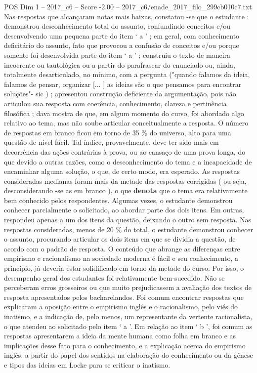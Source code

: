 \begin{textsample}{POS Dim 1 – 2017\_c6 – Score -2.00 – 2017\_c6/enade\_2017\_filo\_299cb010c7.txt}
Nas respostas que alcançaram notas mais baixas, constatou -se que o estudante : demonstrou desconhecimento total do assunto, confundindo conceitos e/ou desenvolvendo uma pequena parte do item ‘ a ’ ; em geral, com conhecimento deficitário do assunto, fato que provocou a confusão de conceitos e/ou porque somente foi desenvolvida parte do item ‘ a ’ ; construiu o texto de maneira incoerente ou tautológica ou a partir do parafrasear do enunciado ou, ainda, totalmente desarticulado, no mínimo, com a pergunta ("quando falamos da ideia, falamos de pensar, organizar [... ] as ideias são o que pensamos para encontrar soluções"- sic ) ; apresentou construção deficiente da argumentação, pois não articulou sua resposta com coerência, conhecimento, clareza e pertinência filosófica ; dava mostra de que, em algum momento do curso, foi abordado algo relativo ao tema, mas não soube articular conceitualmente a resposta.
O número de respostas em branco ficou em torno de 35 \% do universo, alto para uma questão de nível fácil.
Tal índice, provavelmente, deve ter sido mais em decorrência das ações contrárias à prova, ou ao cansaço de uma prova longa, do que devido a outras razões, como o desconhecimento do tema e a incapacidade de encaminhar alguma solução, o que, de certo modo, era esperado.
As respostas consideradas medianas foram mais da metade das respostas corrigidas ( ou seja, desconsiderando -se as em branco ), o que \textbf{denota} que o tema era relativamente bem conhecido pelos respondentes.
Algumas vezes, o estudante demonstrou conhecer parcialmente o solicitado, ao abordar parte dos dois itens.
Em outras, respondeu apenas a um dos itens da questão, deixando o outro sem resposta.
Nas respostas consideradas, menos de 20 \% do total, o estudante demonstrou conhecer o assunto, procurando articular os dois itens em que se dividia a questão, de acordo com o padrão de resposta.
O conteúdo que abrange as diferenças entre empirismo e racionalismo na sociedade moderna é fácil e seu conhecimento, a princípio, já deveria estar solidificado em torno da metade do curso.
Por isso, o desempenho geral dos estudantes foi relativamente bem-sucedido.
Não se perceberam erros grosseiros ou que muito prejudicassem a avaliação dos textos de resposta apresentados pelos bacharelandos.
Foi comum encontrar respostas que explicaram a oposição entre o empirismo inglês e o racionalismo, pelo viés do inatismo, e a indicação de, pelo menos, um representante da vertente racionalista, o que atendeu ao solicitado pelo item ‘ a ’.
Em relação ao item ‘ b ’, foi comum as respostas apresentarem a ideia da mente humana como folha em branco e as implicações desse fato para o conhecimento, e a explicação acerca do empirismo inglês, a partir do papel dos sentidos na elaboração do conhecimento ou da gênese e tipos das ideias em Locke para se criticar o inatismo.

\end{textsample}
